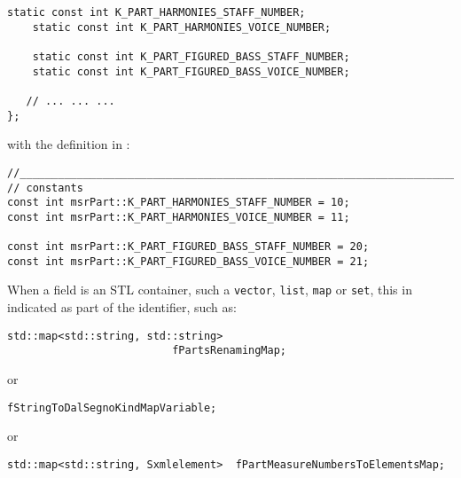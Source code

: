 \begin{itemize}
\begin{lstlisting}[language=CPlusPlus]
    static const int K_PART_HARMONIES_STAFF_NUMBER;
    static const int K_PART_HARMONIES_VOICE_NUMBER;

    static const int K_PART_FIGURED_BASS_STAFF_NUMBER;
    static const int K_PART_FIGURED_BASS_VOICE_NUMBER;

   // ... ... ...
};
\end{lstlisting}

with the definition in :
\begin{lstlisting}[language=CPlusPlus]
//______________________________________________________________________________
// constants
const int msrPart::K_PART_HARMONIES_STAFF_NUMBER = 10;
const int msrPart::K_PART_HARMONIES_VOICE_NUMBER = 11;

const int msrPart::K_PART_FIGURED_BASS_STAFF_NUMBER = 20;
const int msrPart::K_PART_FIGURED_BASS_VOICE_NUMBER = 21;
\end{lstlisting}

\end{itemize}

When a field is an STL container, such a {\tt vector}, {\tt list}, {\tt map} or {\tt set}, this in indicated as part of the identifier, such as:
\begin{lstlisting}[language=CPlusPlus]
    std::map<std::string, std::string>   
                          fPartsRenamingMap;
\end{lstlisting}
or
\begin{lstlisting}[language=CPlusPlus]
                          fStringToDalSegnoKindMapVariable;
\end{lstlisting}
or
\begin{lstlisting}[language=CPlusPlus]
    std::map<std::string, Sxmlelement>  fPartMeasureNumbersToElementsMap;
\end{lstlisting}

